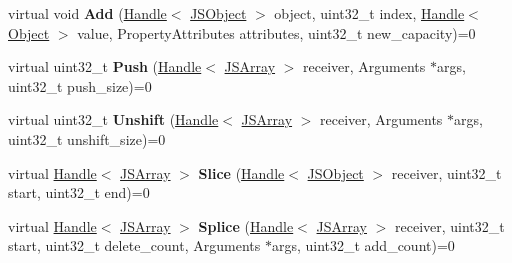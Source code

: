 \begin{DoxyCompactItemize}
\item 
virtual void {\bfseries Add} (\hyperlink{classv8_1_1internal_1_1_handle}{Handle}$<$ \hyperlink{classv8_1_1internal_1_1_j_s_object}{J\+S\+Object} $>$ object, uint32\+\_\+t index, \hyperlink{classv8_1_1internal_1_1_handle}{Handle}$<$ \hyperlink{classv8_1_1internal_1_1_object}{Object} $>$ value, Property\+Attributes attributes, uint32\+\_\+t new\+\_\+capacity)=0\hypertarget{classv8_1_1internal_1_1_elements_accessor_a8d9a82612743c417f632dbdd3fbf3350}{}\label{classv8_1_1internal_1_1_elements_accessor_a8d9a82612743c417f632dbdd3fbf3350}

\item 
virtual uint32\+\_\+t {\bfseries Push} (\hyperlink{classv8_1_1internal_1_1_handle}{Handle}$<$ \hyperlink{classv8_1_1internal_1_1_j_s_array}{J\+S\+Array} $>$ receiver, Arguments $\ast$args, uint32\+\_\+t push\+\_\+size)=0\hypertarget{classv8_1_1internal_1_1_elements_accessor_a022704923340b43a8bbce30e696ceed2}{}\label{classv8_1_1internal_1_1_elements_accessor_a022704923340b43a8bbce30e696ceed2}

\item 
virtual uint32\+\_\+t {\bfseries Unshift} (\hyperlink{classv8_1_1internal_1_1_handle}{Handle}$<$ \hyperlink{classv8_1_1internal_1_1_j_s_array}{J\+S\+Array} $>$ receiver, Arguments $\ast$args, uint32\+\_\+t unshift\+\_\+size)=0\hypertarget{classv8_1_1internal_1_1_elements_accessor_a59f8d7745afe6cf724b3e3fbc0edaceb}{}\label{classv8_1_1internal_1_1_elements_accessor_a59f8d7745afe6cf724b3e3fbc0edaceb}

\item 
virtual \hyperlink{classv8_1_1internal_1_1_handle}{Handle}$<$ \hyperlink{classv8_1_1internal_1_1_j_s_array}{J\+S\+Array} $>$ {\bfseries Slice} (\hyperlink{classv8_1_1internal_1_1_handle}{Handle}$<$ \hyperlink{classv8_1_1internal_1_1_j_s_object}{J\+S\+Object} $>$ receiver, uint32\+\_\+t start, uint32\+\_\+t end)=0\hypertarget{classv8_1_1internal_1_1_elements_accessor_a329bb8eda515cd8047c29d978ab6f4c6}{}\label{classv8_1_1internal_1_1_elements_accessor_a329bb8eda515cd8047c29d978ab6f4c6}

\item 
virtual \hyperlink{classv8_1_1internal_1_1_handle}{Handle}$<$ \hyperlink{classv8_1_1internal_1_1_j_s_array}{J\+S\+Array} $>$ {\bfseries Splice} (\hyperlink{classv8_1_1internal_1_1_handle}{Handle}$<$ \hyperlink{classv8_1_1internal_1_1_j_s_array}{J\+S\+Array} $>$ receiver, uint32\+\_\+t start, uint32\+\_\+t delete\+\_\+count, Arguments $\ast$args, uint32\+\_\+t add\+\_\+count)=0\hypertarget{classv8_1_1internal_1_1_elements_accessor_a3741c0e19003153b1f0e40b621232adf}{}\label{classv8_1_1internal_1_1_elements_accessor_a3741c0e19003153b1f0e40b621232adf}


\end{DoxyCompactItemize}
